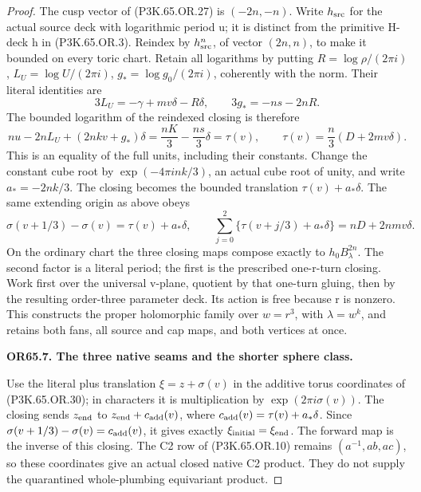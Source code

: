 \begin{proof}
The cusp vector of (P3K.65.OR.27) is \((-2n,-n)\). Write
\(h_{\rm src}\) for the actual source deck with logarithmic period u;
it is distinct from the primitive H-deck h in (P3K.65.OR.3).
Reindex by \(h_{\rm src}^n\), of vector \((2n,n)\), to make it
bounded on every toric chart. Retain all logarithms by putting
\(R=\log\rho/(2\pi i)\), \(L_U=\log U/(2\pi i)\),
\(g_*=\log g_0/(2\pi i)\), coherently with the norm. Their
literal identities are
\[
 3L_U=-\gamma+mv\delta-R\delta,\qquad
 3g_*=-ns-2nR.
\]
The bounded logarithm of the reindexed closing is therefore
\[
 nu-2nL_U+(2nkv+g_*)\delta
       =\frac{nK}{3}-\frac{ns}{3}\delta
       =\tau(v),\qquad
 \tau(v)=\frac n3(D+2mv\delta).                    \tag{P3K.65.OR.29}
\]
This is an equality of the full units, including their constants.
Change the constant cube root by
\(\exp(-4\pi i nk/3)\), an actual cube root of unity, and write
\(a_*=-2nk/3\). The closing becomes the bounded translation
\(\tau(v)+a_*\delta\). The same extending origin as above obeys
\[
 \sigma(v+1/3)-\sigma(v)=\tau(v)+a_*\delta,\qquad
 \sum_{j=0}^2\{\tau(v+j/3)+a_*\delta\}=nD+2nmv\delta.
                                                               \tag{P3K.65.OR.30}
\]
On the ordinary chart the three closing maps compose exactly to
\(h_0B_\lambda^{2n}\). The second factor is a literal period;
the first is the prescribed one-r-turn closing. Work first over
the universal v-plane, quotient by that one-turn gluing, then
by the resulting order-three parameter deck. Its action is free
because r is nonzero. This constructs the proper holomorphic
family over \(w=r^3\), with \(\lambda=w^k\), and retains both
fans, all source and cap maps, and both vertices at once.

\par\medskip\noindent\textbf{OR65.7. The three native seams and the shorter sphere class.}\par\nopagebreak[4]

Use the literal plus translation \(\xi=z+\sigma(v)\) in the
additive torus coordinates of (P3K.65.OR.30); in characters it is
multiplication by \(\exp(2\pi i\sigma(v))\). The closing sends
\(z_{\rm end}\) to \(z_{\rm end}+c_{\rm add}(v)\), where
\(c_{\rm add}(v)=\tau(v)+a_*\delta\). Since
\(\sigma(v+1/3)-\sigma(v)=c_{\rm add}(v)\), it gives exactly
\(\xi_{\rm initial}=\xi_{\rm end}\). The forward map is the
inverse of this closing. The C2 row of
(P3K.65.OR.10) remains \((a^{-1},ab,ac)\), so these coordinates give
an actual closed native C2 product. They do not supply the
quarantined whole-plumbing equivariant product.


\end{proof}
